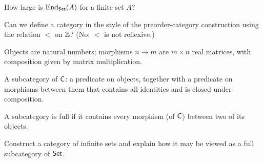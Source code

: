 \begin{exercise}
  \label{exer:prelims:card-end-type-category}
  How large is $\operatorname{End}_{\mathsf{Set}}(A)$ for a finite set $A$?
\end{exercise}

\begin{exercise}
  \label{exer:prelims:no-category-strict-ineq}
  Can we define a category in the style of the preorder-category
  construction using the relation $<$ on $\mathbb{Z}$? (No: $<$ is not
  reflexive.)
\end{exercise}

\begin{definition}
  \label{def:prelims:matrix-category}
  \leanok
  Objects are natural numbers; morphisms $n \to m$ are $m \times n$
  real matrices, with composition given by matrix multiplication.
\end{definition}

\begin{definition}[Subcategory]
  \label{def:prelims:subcategory}
  \leanok
  A subcategory of $\mathsf{C}$: a predicate on objects, together with
  a predicate on morphisms between them that contains all identities
  and is closed under composition.
\end{definition}

\begin{definition}
  \label{def:prelims:subcategory-is-full}
  \leanok
  A subcategory is full if it contains every morphism (of
  $\mathsf{C}$) between two of its objects.
\end{definition}

\begin{exercise}
  \label{exer:prelims:subcat}
  Construct a category of infinite sets and explain how it may be
  viewed as a full subcategory of $\mathsf{Set}$.
\end{exercise}

